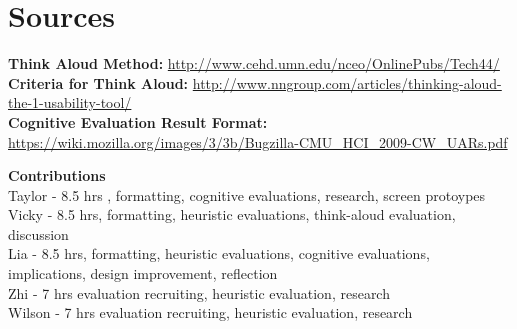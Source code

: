 \documentclass[pdftex,12pt,a4paper]{report}
\begin{document}
\section*{Sources}
\textbf{Think Aloud Method:} {\url{http://www.cehd.umn.edu/nceo/OnlinePubs/Tech44/}}
\\\textbf{Criteria for Think Aloud:} {\url{http://www.nngroup.com/articles/thinking-aloud-the-1-usability-tool/}}
\\\textbf{Cognitive Evaluation Result Format:} {\url{https://wiki.mozilla.org/images/3/3b/Bugzilla-CMU_HCI_2009-CW_UARs.pdf}}



\vspace{1.5cm}
\textbf{Contributions}
\\Taylor - 8.5 hrs , formatting, cognitive evaluations, research, screen protoypes
\\Vicky - 8.5 hrs, formatting, heuristic evaluations, think-aloud evaluation, discussion
\\Lia - 8.5 hrs, formatting, heuristic evaluations, cognitive evaluations, implications, design improvement, reflection
\\Zhi - 7 hrs evaluation recruiting, heuristic evaluation, research
\\Wilson - 7 hrs evaluation recruiting, heuristic evaluation, research
\end{document}
